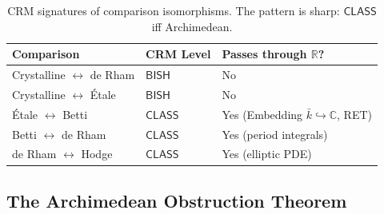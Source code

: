 \documentclass[11pt,a4paper]{article}
\theoremstyle{plain}
\theoremstyle{definition}
\newcommand{\BISH}{\textsf{BISH}}
\newcommand{\CLASS}{\textsf{CLASS}}
\newcommand{\R}{\mathbb{R}}
\newcommand{\C}{\mathbb{C}}
\begin{document}
\begin{table}[h]
\centering
\begin{tabular}{@{}lll@{}}
\toprule
\textbf{Comparison} & \textbf{CRM Level} & \textbf{Passes through $\R$?} \\
\midrule
Crystalline $\leftrightarrow$ de Rham & $\BISH$ & No \\
Crystalline $\leftrightarrow$ \'Etale & $\BISH$ & No \\
\'Etale $\leftrightarrow$ Betti & $\CLASS$ & Yes (Embedding $\bar{k} \hookrightarrow \C$, RET) \\
Betti $\leftrightarrow$ de Rham & $\CLASS$ & Yes (period integrals) \\
de Rham $\leftrightarrow$ Hodge & $\CLASS$ & Yes (elliptic PDE) \\
\bottomrule
\end{tabular}
\caption{CRM signatures of comparison isomorphisms. The pattern is sharp: $\CLASS$ iff Archimedean.}
\label{tab:comparisons}
\end{table}

\subsection{The Archimedean Obstruction Theorem}
\end{document}
